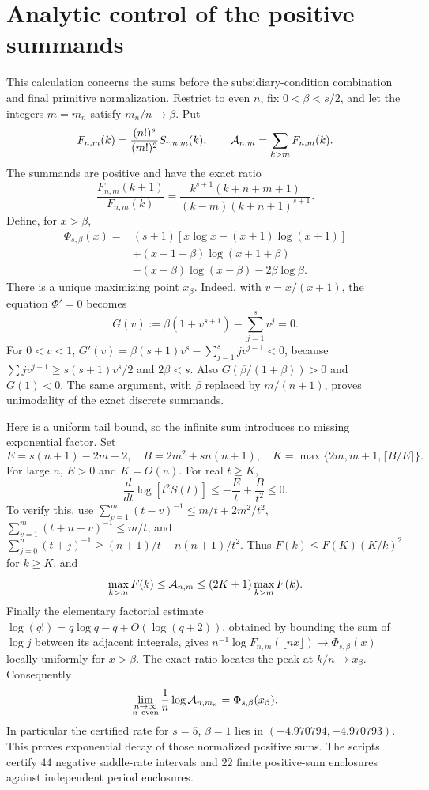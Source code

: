 \documentclass[11pt]{article}
\begin{document}
\section{Analytic control of the positive summands}
This calculation concerns the sums before the subsidiary-condition
combination and final primitive normalization. Restrict to even $n$,
fix $0<\beta<s/2$, and let the integers $m=m_n$ satisfy $m_n/n\to\beta$. Put
\[
 F_{n,m}(k)=\frac{(n!)^s}{(m!)^2}S_{r,n,m}(k),\qquad
 {\cal A}_{n,m}=\sum_{k>m}F_{n,m}(k).
\]
The summands are positive and have the exact ratio
\[
 \frac{F_{n,m}(k+1)}{F_{n,m}(k)}
 =\frac{k^{s+1}(k+n+m+1)}{(k-m)(k+n+1)^{s+1}}.
\]
Define, for $x>\beta$,
\[
 \begin{aligned}
 \Phi_{s,\beta}(x)={}&(s+1)[x\log x-(x+1)\log(x+1)]\\
 &+(x+1+\beta)\log(x+1+\beta)\\
 &-(x-\beta)\log(x-\beta)-2\beta\log\beta.
 \end{aligned}
\]
There is a unique maximizing point $x_\beta$. Indeed, with
$v=x/(x+1)$, the equation $\Phi'=0$ becomes
\[
 G(v):=\beta(1+v^{s+1})-\sum_{j=1}^s v^j=0.
\]
For $0<v<1$,
$G'(v)=\beta(s+1)v^s-\sum_{j=1}^sjv^{j-1}<0$, because
$\sum jv^{j-1}\ge s(s+1)v^s/2$ and $2\beta<s$.
Also $G(\beta/(1+\beta))>0$ and $G(1)<0$.
The same argument, with $\beta$ replaced by $m/(n+1)$, proves
unimodality of the exact discrete summands.

Here is a uniform tail bound, so the infinite sum introduces no missing
exponential factor. Set
\[
 E=s(n+1)-2m-2,\quad B=2m^2+sn(n+1),\quad
 K=\max\{2m,m+1,\lceil B/E\rceil\}.
\]
For large $n$, $E>0$ and $K=O(n)$. For real $t\ge K$,
\[
 \frac{d}{dt}\log[t^2S(t)]
 \le-\frac E t+\frac B{t^2}\le0.
\]
To verify this, use
$\sum_{v=1}^m(t-v)^{-1}\le m/t+2m^2/t^2$,
$\sum_{v=1}^m(t+n+v)^{-1}\le m/t$, and
$\sum_{j=0}^n(t+j)^{-1}\ge(n+1)/t-n(n+1)/t^2$.
Thus $F(k)\le F(K)(K/k)^2$ for $k\ge K$, and
\[
 \max_{k>m}F(k)\le {\cal A}_{n,m}
 \le(2K+1)\max_{k>m}F(k).
\]
Finally the elementary factorial estimate
$\log(q!)=q\log q-q+O(\log(q+2))$, obtained by bounding
the sum of $\log j$ between its adjacent integrals, gives
$n^{-1}\log F_{n,m}(\lfloor nx\rfloor)\to\Phi_{s,\beta}(x)$
locally uniformly for $x>\beta$. The exact ratio locates the peak at
$k/n\to x_\beta$. Consequently
\begin{equation}
 \lim_{\substack{n\to\infty\\ n\ \mathrm{even}}}
 \frac1n\log{\cal A}_{n,m_n}
 =\Phi_{s,\beta}(x_\beta).
 \label{eq:analyticrate}
\end{equation}
In particular the certified rate for $s=5$, $\beta=1$ lies in
$(-4.970794,-4.970793)$. This proves exponential decay of those normalized
positive sums. The scripts certify $44$ negative saddle-rate intervals
and $22$ finite positive-sum enclosures against independent period
enclosures.
\end{document}
